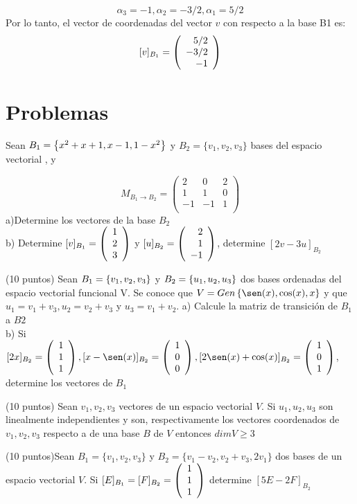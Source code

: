 \begin{ejercicio}
\[\alpha_3=-1, \alpha_2=-3/2, \alpha_1=5/2\]
Por lo tanto, el vector de coordenadas del vector $v$ con respecto a la base B1 es:
\[[v]_{B_1}=\left( \begin{array}{r} 5/2\\ -3/2\\ -1 \end{array} \right) \]


\end{ejercicio}

\section{Problemas}
\begin{enumerate}

\begin{prob}[]

Sean $B_1= \left\{x^2+x+1, x-1, 1-x^2 \right\} $ y $B_2=\{v_1, v_2, v_3\}$ bases del espacio vectorial \pdos, y 

\[M_{B_1 \rightarrow B_2}=\left(\begin{array}{rrr}
2&0&2\\
1&1&0\\
-1&-1&1\\
\end{array}\right)\]
a)Determine los vectores de la base $B_2$
~\\b) Determine $[v]_{B_1}=\left( \begin{array}{r} 1\\ 2\\ 3 \end{array} \right) $ y $[u]_{B_2}=\left( \begin{array}{r} 2\\ 1\\ -1 \end{array} \right) $, determine $[2v-3u]_{B_2}$
\end{prob}

\begin{prob}
(10 puntos) Sean $B_1= \left\{v_1, v_2, v_3 \right\} $ y $B_2= \left\{u_1, u_2, u_3 \right\} $ dos bases ordenadas del espacio vectorial funcional V. Se conoce que $V=Gen\llav{\sen(x), \cos(x), x}$ y que $u_1=v_1+v_3, u_2=v_2+v_3 $ y $u_3= v_1+v_2$.
a) Calcule la matriz de transición de $B_1$ a $B2$ ~\\
b) Si $[2x]_{B_2}=\vectrtres{1}{1}{1}, [x-\sen(x)]_{B_2}=\vectrtres{1}{0}{0}, [2\sen(x)+\cos(x)]_{B_2}=\vectrtres{1}{0}{1}$, determine los vectores de $B_1$
\end{prob}



\begin{prob}
(10 puntos) Sean $v_1, v_2, v_3 $ vectores de un espacio vectorial $V$. Si $u_1, u_2, u_3 $ son linealmente independientes y son, respectivamente los vectores coordenados de $ v_1, v_2, v_3$ respecto a de una base $ B $ de $V$ entonces $dim V \geq 3 $
\end{prob}
\newpage
\begin{prob}
(10 puntos)Sean $B_1=\{v_1, v_2, v_3\}$ y $B_2=\{v_1-v_2, v_2+v_3, 2v_1\}$ dos bases de un espacio vectorial $V$. Si $[E]_{B_1}=[F]_{B_2}=\left( \begin{array}{r} 1\\ 1\\ 1 \end{array} \right) $ determine $[5E-2F]_{B_2}$
\end{prob}

\end{enumerate}
